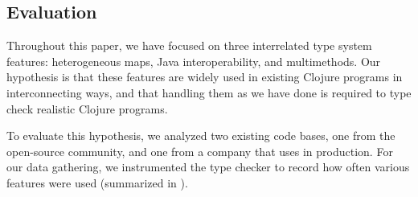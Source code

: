 %
%
%

\subsection{Evaluation}
\label{sec:casestudy}

Throughout this paper, we have focused on three interrelated type
system features: heterogeneous maps, Java interoperability, and
multimethods. Our hypothesis is that these features are widely used in
existing Clojure programs in interconnecting ways, and that handling
them as we have done is required to type check realistic Clojure
programs.



To evaluate this hypothesis, we analyzed two existing \coretyped{}
code bases, one from the open-source community, and one from a company
that uses \coretyped{} in production. For our data gathering, we
instrumented the \coretyped{} type checker to record how often
various features were used (summarized in 
). 

